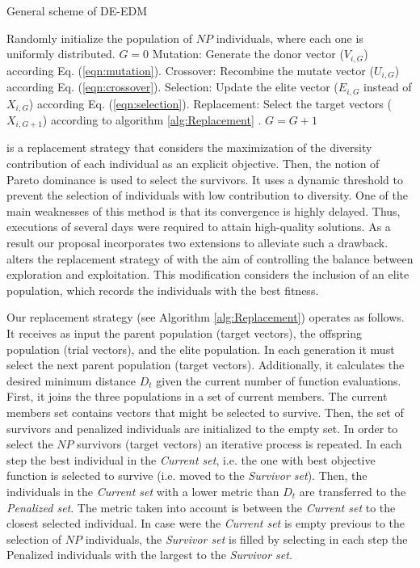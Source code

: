 \begin{algorithm}[H]
  \scriptsize
	\caption{General scheme of DE-EDM} 
	\begin{algorithmic}[1]
	\STATE Randomly initialize the population of $NP$ individuals, where each one is uniformly distributed.
	\STATE $G=0$
		\STATE Mutation: Generate the donor vector ($V_{i,G}$) according Eq. (\ref{eqn:mutation}).
		\STATE Crossover: Recombine the mutate vector ($U_{i,G}$) according Eq. (\ref{eqn:crossover}).
		\STATE Selection: Update the elite vector ($E_{i,G}$ instead of $X_{i,G}$) according Eq. (\ref{eqn:selection}).
		\STATE Replacement: Select the target vectors ($X_{i,G+1}$) according to algorithm \ref{alg:Replacement} .
	   \ENDFOR
	   \STATE $G=G+1$
	\ENDWHILE
    \label{alg:Fase_Remplazo_VSD-MOEAD}
\end{algorithmic}
\end{algorithm}



\RMDDC{} is a replacement strategy that considers the maximization of the diversity 
contribution of each individual as an explicit objective.
%
Then, the notion of Pareto dominance is used to select the survivors.
%
It uses a dynamic threshold to prevent the selection of individuals with low contribution to diversity.
%
One of the main weaknesses of this method is that its convergence is highly delayed.
%
Thus, executions of several days were required to attain high-quality solutions.
%
As a result our proposal incorporates two extensions to alleviate such a drawback.
%
\DEEDM{} alters the replacement strategy of \DE{} with the aim of controlling the 
balance between exploration and exploitation.
%
This modification considers the inclusion of an elite population, which records the individuals with the best fitness.
%

Our replacement strategy (see Algorithm \ref{alg:Replacement}) operates as follows.
%
It receives as input the parent population (target vectors), the offspring population (trial vectors), and the elite population.
%
In each generation it must select the next parent population (target vectors).
%
Additionally, it calculates the desired minimum distance $D_t$ given the current number of function evaluations.
%
First, it joins the three populations in a set of current members.
%
The current members set contains vectors that might be selected to survive.
%
Then, the set of survivors and penalized individuals are initialized to the empty set.
%
In order to select the $NP$ survivors (target vectors) an iterative process is repeated.
%
In each step the best individual in the \textit{Current set}, i.e. the one with best objective function is selected
to survive (i.e. moved to the \textit{Survivor set}).
%
Then, the individuals in the \textit{Current set} with a lower metric \DCN{} than $D_t$ are transferred to the \textit{Penalized set}.
%
The \DCN{} metric taken into account is between the \textit{Current set} to the closest selected individual.
%
In case were the \textit{Current set} is empty previous to the selection of $NP$ individuals, the \textit{Survivor set} is filled by selecting in each step the Penalized individuals with the largest \DCN{} to the \textit{Survivor set}.


